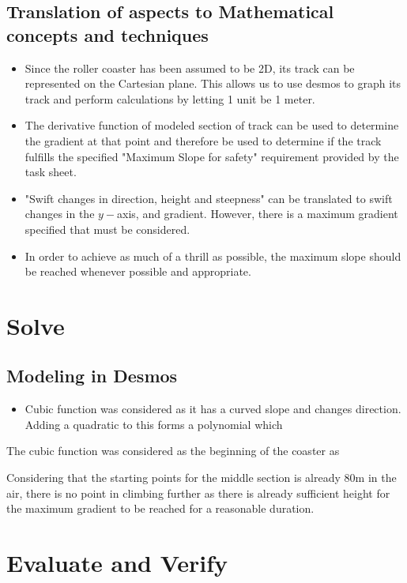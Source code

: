 \documentclass[11pt, letterpaper]{article}
\begin{document}
\subsection{Translation of aspects to Mathematical concepts and techniques}
\begin{itemize}
	\item Since the roller coaster has been assumed to be 2D, its track can be represented on the Cartesian plane. This allows us to use desmos to graph its track and perform calculations by letting 1 unit be 1 meter. 
	\item The derivative function of modeled section of track can be used to determine the gradient at that point and therefore be used to determine if the track fulfills the specified "Maximum Slope for safety" requirement provided by the task sheet.
	\item "Swift changes in direction, height and steepness" can be translated to swift changes in the $y-$axis, and gradient. However, there is a maximum gradient specified that must be considered. 
	\item In order to achieve as much of a thrill as possible, the maximum slope should be reached whenever possible and appropriate.

\end{itemize}


\section{Solve}
\subsection{Modeling in Desmos}
\begin{itemize}
	\item Cubic function was considered as it has a curved slope and changes direction. Adding a quadratic to this forms a polynomial which 
\end{itemize}
\item The cubic function was considered as the beginning of the coaster as 
\item Considering that the starting points for the middle section is already 80m in the air, there is no point in climbing further as there is already sufficient height for the maximum gradient to be reached for a reasonable duration. 



\section{Evaluate and Verify}
\end{document}
